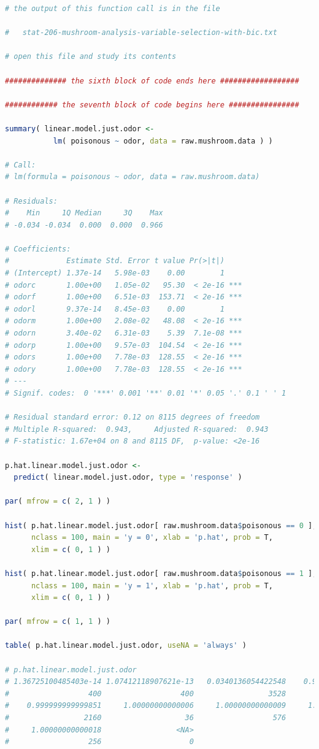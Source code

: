 \documentclass[12pt]{article}
\begin{document}
\begin{lstlisting}[language = R]
# the output of this function call is in the file

#   stat-206-mushroom-analysis-variable-selection-with-bic.txt

# open this file and study its contents

############## the sixth block of code ends here ##################

############ the seventh block of code begins here ################

summary( linear.model.just.odor <- 
           lm( poisonous ~ odor, data = raw.mushroom.data ) )

# Call:
# lm(formula = poisonous ~ odor, data = raw.mushroom.data)

# Residuals:
#    Min     1Q Median     3Q    Max 
# -0.034 -0.034  0.000  0.000  0.966 

# Coefficients:
#             Estimate Std. Error t value Pr(>|t|)    
# (Intercept) 1.37e-14   5.98e-03    0.00        1    
# odorc       1.00e+00   1.05e-02   95.30  < 2e-16 ***
# odorf       1.00e+00   6.51e-03  153.71  < 2e-16 ***
# odorl       9.37e-14   8.45e-03    0.00        1    
# odorm       1.00e+00   2.08e-02   48.08  < 2e-16 ***
# odorn       3.40e-02   6.31e-03    5.39  7.1e-08 ***
# odorp       1.00e+00   9.57e-03  104.54  < 2e-16 ***
# odors       1.00e+00   7.78e-03  128.55  < 2e-16 ***
# odory       1.00e+00   7.78e-03  128.55  < 2e-16 ***
# ---
# Signif. codes:  0 '***' 0.001 '**' 0.01 '*' 0.05 '.' 0.1 ' ' 1

# Residual standard error: 0.12 on 8115 degrees of freedom
# Multiple R-squared:  0.943,     Adjusted R-squared:  0.943 
# F-statistic: 1.67e+04 on 8 and 8115 DF,  p-value: <2e-16

p.hat.linear.model.just.odor <- 
  predict( linear.model.just.odor, type = 'response' )

par( mfrow = c( 2, 1 ) )

hist( p.hat.linear.model.just.odor[ raw.mushroom.data$poisonous == 0 ],
      nclass = 100, main = 'y = 0', xlab = 'p.hat', prob = T,
      xlim = c( 0, 1 ) )

hist( p.hat.linear.model.just.odor[ raw.mushroom.data$poisonous == 1 ],
      nclass = 100, main = 'y = 1', xlab = 'p.hat', prob = T,
      xlim = c( 0, 1 ) )

par( mfrow = c( 1, 1 ) )

table( p.hat.linear.model.just.odor, useNA = 'always' )

# p.hat.linear.model.just.odor
# 1.36725100485403e-14 1.07412118907621e-13   0.0340136054422548    0.999999999999688 
#                  400                  400                 3528                  192 
#    0.999999999999851     1.00000000000006     1.00000000000009     1.00000000000016 
#                 2160                   36                  576                  576 
#     1.00000000000018                 <NA> 
#                  256                    0 


\end{lstlisting}
\end{document}
